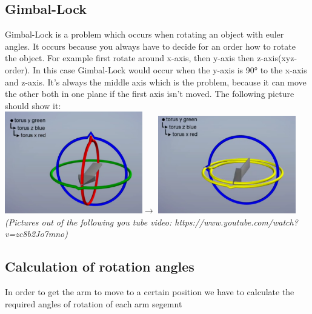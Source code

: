 \subsection{Gimbal-Lock}
Gimbal-Lock is a problem which occurs when rotating an object with euler angles. It occurs because you always have to decide for an order how to rotate the object. For example first rotate around x-axis, then y-axis then z-axis(xyz-order). In this case Gimbal-Lock would occur when the y-axis is 90° to the x-axis and z-axis. It's always the middle axis which is the problem, because it can move the other both in one plane if the first axis isn't moved. The following picture should show it:\\
\includegraphics[width=0.45\textwidth]{imgs/GimbalLock/GimbalLock1.png}$\rightarrow$
\includegraphics[width=0.45\textwidth]{imgs/GimbalLock/GimbalLock2.png}\\
\textit{(Pictures out of the following you tube video: https://www.youtube.com/watch?v=zc8b2Jo7mno)}

\subsection{Calculation of rotation angles}
In order to get the arm to move to a certain position we have to calculate the required angles of rotation of each arm segemnt